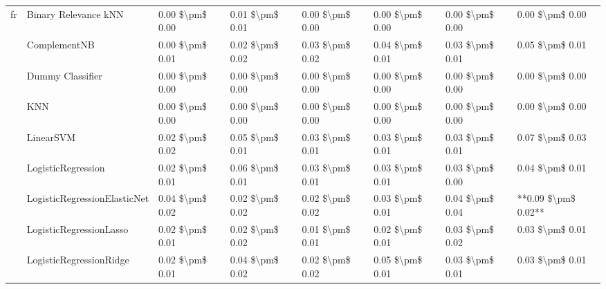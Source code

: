 \begin{tabular}{llllllll}
fr & Binary Relevance kNN &  0.00 \$\textbackslash pm\$ 0.00 &           0.01 \$\textbackslash pm\$ 0.01 &       0.00 \$\textbackslash pm\$ 0.00 &        0.00 \$\textbackslash pm\$ 0.00 &                         0.00 \$\textbackslash pm\$ 0.00 &      0.00 \$\textbackslash pm\$ 0.00 \\
   & ComplementNB &  0.00 \$\textbackslash pm\$ 0.01 &           0.02 \$\textbackslash pm\$ 0.02 &       0.03 \$\textbackslash pm\$ 0.02 &        0.04 \$\textbackslash pm\$ 0.01 &                         0.03 \$\textbackslash pm\$ 0.01 &      0.05 \$\textbackslash pm\$ 0.01 \\
   & Dummy Classifier &  0.00 \$\textbackslash pm\$ 0.00 &           0.00 \$\textbackslash pm\$ 0.00 &       0.00 \$\textbackslash pm\$ 0.00 &        0.00 \$\textbackslash pm\$ 0.00 &                         0.00 \$\textbackslash pm\$ 0.00 &      0.00 \$\textbackslash pm\$ 0.00 \\
   & KNN &  0.00 \$\textbackslash pm\$ 0.00 &           0.00 \$\textbackslash pm\$ 0.00 &       0.00 \$\textbackslash pm\$ 0.00 &        0.00 \$\textbackslash pm\$ 0.00 &                         0.00 \$\textbackslash pm\$ 0.00 &      0.00 \$\textbackslash pm\$ 0.00 \\
   & LinearSVM &  0.02 \$\textbackslash pm\$ 0.02 &           0.05 \$\textbackslash pm\$ 0.01 &       0.03 \$\textbackslash pm\$ 0.01 &        0.03 \$\textbackslash pm\$ 0.01 &                         0.03 \$\textbackslash pm\$ 0.01 &      0.07 \$\textbackslash pm\$ 0.03 \\
   & LogisticRegression &  0.02 \$\textbackslash pm\$ 0.01 &           0.06 \$\textbackslash pm\$ 0.01 &       0.03 \$\textbackslash pm\$ 0.01 &        0.03 \$\textbackslash pm\$ 0.01 &                         0.03 \$\textbackslash pm\$ 0.00 &      0.04 \$\textbackslash pm\$ 0.01 \\
   & LogisticRegressionElasticNet &  0.04 \$\textbackslash pm\$ 0.02 &           0.02 \$\textbackslash pm\$ 0.02 &       0.02 \$\textbackslash pm\$ 0.02 &        0.03 \$\textbackslash pm\$ 0.01 &                         0.04 \$\textbackslash pm\$ 0.04 &  **0.09 \$\textbackslash pm\$ 0.02** \\
   & LogisticRegressionLasso &  0.02 \$\textbackslash pm\$ 0.01 &           0.02 \$\textbackslash pm\$ 0.02 &       0.01 \$\textbackslash pm\$ 0.01 &        0.02 \$\textbackslash pm\$ 0.01 &                         0.03 \$\textbackslash pm\$ 0.02 &      0.03 \$\textbackslash pm\$ 0.01 \\
   & LogisticRegressionRidge &  0.02 \$\textbackslash pm\$ 0.01 &           0.04 \$\textbackslash pm\$ 0.02 &       0.02 \$\textbackslash pm\$ 0.02 &        0.05 \$\textbackslash pm\$ 0.01 &                         0.03 \$\textbackslash pm\$ 0.01 &      0.03 \$\textbackslash pm\$ 0.01 \\

\end{tabular}
